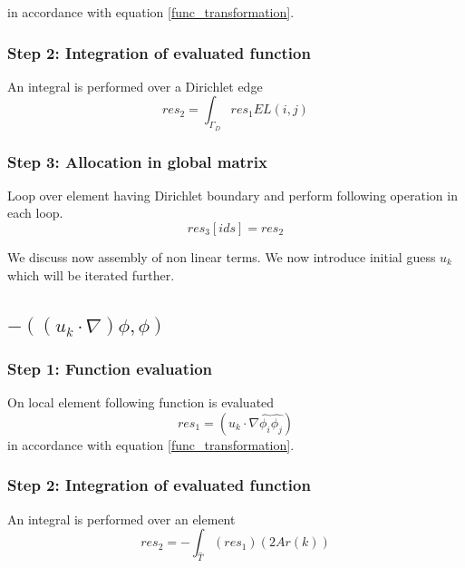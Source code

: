 \documentclass[a4paper]{book}
\begin{document}
in accordance with equation \ref{func_transformation}.\\

\subsubsection{Step 2: Integration of evaluated function}

An integral is performed over a Dirichlet edge 
\begin{equation}
res_2 = \int_{\Gamma_D} res_1 EL(i,j)
\end{equation}

\subsubsection{Step 3: Allocation in global matrix}

Loop over element having Dirichlet boundary and perform following operation in each loop. 
\begin{equation}
res_3[ids] = res_2
\end{equation}

We discuss now assembly of non linear terms. We now introduce initial guess $u_k$ which will be iterated further.\\

\subsection{$-((u_k \cdot \nabla)\phi , \phi)$}

\subsubsection{Step 1: Function evaluation}

On local element following function is evaluated 
\begin{equation}
res_1 = (u_k \cdot \nabla \hat{\phi_i} \hat{\phi_j})
\end{equation} 
in accordance with equation \ref{func_transformation}.\\

\subsubsection{Step 2: Integration of evaluated function}

An integral is performed over an element 
\begin{equation}
res_2= - \int_{\hat{T}} (res_1) (2Ar(k))
\end{equation}
\end{document}
